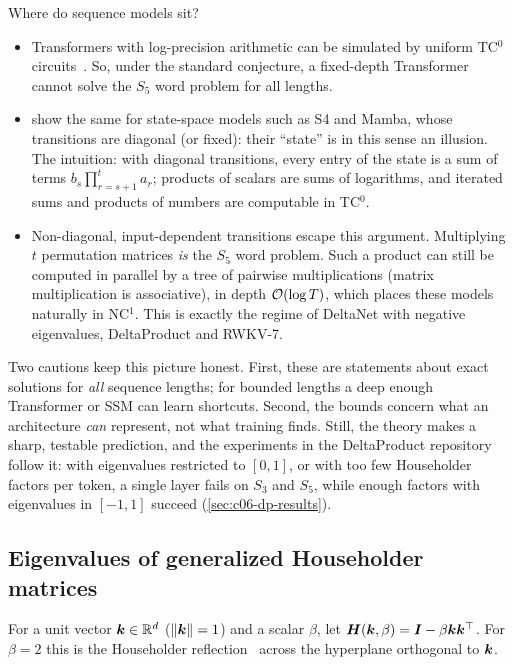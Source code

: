 Where do sequence models sit?
\begin{itemize}
\item Transformers with log-precision arithmetic can be simulated by uniform TC$^0$
circuits~\citep{c06-merrill2023parallelism}. So, under the standard conjecture, a
fixed-depth Transformer cannot solve the $S_5$ word problem for all lengths.
\item \citet{c06-merrill2024illusion} show the same for state-space models such as S4 and
Mamba, whose transitions are diagonal (or fixed): their ``state'' is in this sense an
illusion. The intuition: with diagonal transitions, every entry of the state is a sum of
terms $b_s\prod_{r=s+1}^{t}a_r$; products of scalars are sums of logarithms, and iterated
sums and products of numbers are computable in TC$^0$.
\item Non-diagonal, input-dependent transitions escape this argument. Multiplying
$t$ permutation matrices \emph{is} the $S_5$ word problem. Such a product can still be
computed in parallel by a tree of pairwise multiplications (matrix multiplication is
associative), in depth $\mathcal{O}(\log T)$, which places these models naturally in NC$^1$.
This is exactly the regime of DeltaNet with negative eigenvalues, DeltaProduct and RWKV-7.
\end{itemize}
Two cautions keep this picture honest. First, these are statements about exact solutions
for \emph{all} sequence lengths; for bounded lengths a deep enough Transformer or SSM can
learn shortcuts. Second, the bounds concern what an architecture \emph{can} represent, not
what training finds. Still, the theory makes a sharp, testable prediction, and the
experiments in the DeltaProduct repository follow it: with eigenvalues restricted to $[0,1]$,
or with too few Householder factors per token, a single layer fails on $S_3$ and $S_5$, while
enough factors with eigenvalues in $[-1,1]$ succeed (\cref{sec:c06-dp-results}).

\subsection{Eigenvalues of generalized Householder matrices}\label{sec:c06-householder}

\begin{definition}\label{def:c06-householder}
For a unit vector $\bm{k}\in\mathbb{R}^{d}$ ($\left\lVert \bm{k}\right\rVert=1$) and a scalar $\beta$, let
$\bm{H}(\bm{k},\beta)=\bm{I}-\beta\bm{k}\bm{k}^{\top}$. For $\beta=2$ this is the Householder
reflection~\citep{c06-householder1958} across the hyperplane orthogonal to $\bm{k}$.
\end{definition}

